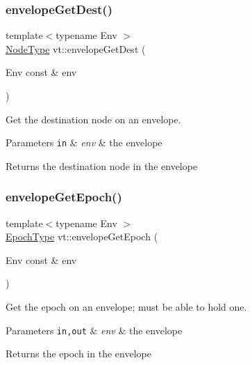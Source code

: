 \subsubsection{\texorpdfstring{envelope\+Get\+Dest()}{envelopeGetDest()}}
{\footnotesize\ttfamily template$<$typename Env $>$ \\
\hyperlink{namespacevt_a866da9d0efc19c0a1ce79e9e492f47e2}{Node\+Type} vt\+::envelope\+Get\+Dest (\begin{DoxyParamCaption}\item[{Env const \&}]{env }\end{DoxyParamCaption})\hspace{0.3cm}{\ttfamily [inline]}}



Get the destination node on an envelope. 


\begin{DoxyParams}[1]{Parameters}
\mbox{\tt in}  & {\em env} & the envelope\\
\hline
\end{DoxyParams}
\begin{DoxyReturn}{Returns}
the destination node in the envelope 
\end{DoxyReturn}
\mbox{\label{namespacevt_ad5495e7900227550b44837e899c5bb13}} 
\subsubsection{\texorpdfstring{envelope\+Get\+Epoch()}{envelopeGetEpoch()}}
{\footnotesize\ttfamily template$<$typename Env $>$ \\
\hyperlink{namespacevt_a81d11b28122d43bf9834577e4a06440f}{Epoch\+Type} vt\+::envelope\+Get\+Epoch (\begin{DoxyParamCaption}\item[{Env const \&}]{env }\end{DoxyParamCaption})\hspace{0.3cm}{\ttfamily [inline]}}



Get the epoch on an envelope; must be able to hold one. 


\begin{DoxyParams}[1]{Parameters}
\mbox{\tt in,out}  & {\em env} & the envelope\\
\hline
\end{DoxyParams}
\begin{DoxyReturn}{Returns}
the epoch in the envelope 
\end{DoxyReturn}
\mbox{\label{namespacevt_a76b9bdf05b27d6470bac66186c32d9eb}} 
